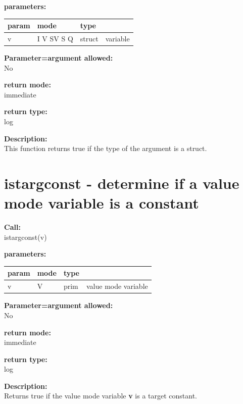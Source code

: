         {\bf parameters:} \\
        \begin{tabular}{| l | l | l | l |}
        \hline
        param  & mode & type & \\
        \hline \hline
        v & I V SV S Q & struct & variable  \\ \hline
        \end{tabular}
        
        {\bf Parameter=argument allowed:} \\
        No
        
        {\bf return mode:} \\
        immediate

        {\bf return type:} \\
        log
        
        {\bf Description:} \\
        This function returns true if the type of the argument is a struct.
       

    \section{istargconst - determine if a value mode variable is a constant}\label{sec:ifistargconst}
        
        {\bf Call:} \\
        istargconst(v)
        
        {\bf parameters:} \\
        \begin{tabular}{| l | l | l | l |}
        \hline
        param  & mode & type & \\
        \hline \hline
        v & V & prim & value mode variable \\ \hline
        \end{tabular}
        
        {\bf Parameter=argument allowed:} \\
        No
        
        {\bf return mode:} \\
        immediate

        {\bf return type:} \\
        log
        
        {\bf Description:} \\
        Returns true if the value mode variable {\bf v} is a target constant.

        

